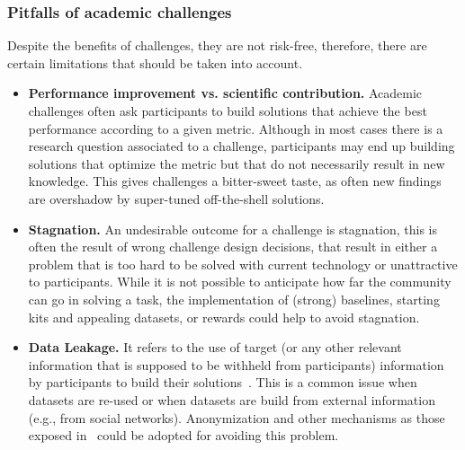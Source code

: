 \documentclass[twoside,11pt]{article}
\begin{document}
\subsubsection{Pitfalls of academic challenges}
Despite the benefits of challenges, they are not risk-free, therefore, there are certain limitations that should be taken into account. %
\begin{itemize}
    \item \textbf{Performance improvement vs. scientific contribution.} Academic challenges often ask participants to build solutions that achieve the best performance according to a given metric. Although in most cases there is a research question associated to a challenge, participants may end up building solutions that optimize the metric but that do not necessarily result in new knowledge. This gives challenges a bitter-sweet taste, as often new findings are overshadow by super-tuned off-the-shell solutions. 
    \item \textbf{Stagnation.} An undesirable outcome for a challenge is stagnation, this is often the result of wrong challenge design decisions, that result in either a problem that is too hard to be solved with current technology or unattractive to participants. While it is not possible to anticipate how far the community can go in solving a task, the implementation of (strong) baselines, starting kits and appealing datasets, or rewards could help to avoid stagnation.    
    \item \textbf{Data Leakage.} It refers to the use of target (or any other relevant information that is supposed to be withheld from participants) information by participants to build their solutions~\citep{LeakageSIGKDD}. This is a common issue when datasets are re-used or when datasets are build from external information (e.g., from social networks). Anonymization and other mechanisms as those exposed in~\citep{LeakageSIGKDD} could be adopted for avoiding this problem.    

\end{itemize}
\end{document}
